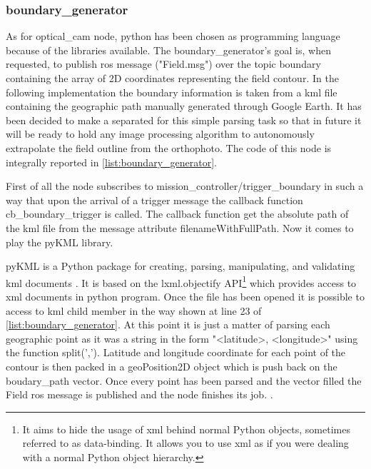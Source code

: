\subsubsection{boundary\_generator} %
\label{ssub:boundary_generator}
As for \textsf{optical\_cam} node, python has been chosen as programming language because of the libraries available.
The \textsf{boundary\_generator}'s goal is, when requested, to publish \acrshort{ros} message ("Field.msg") over the topic \textsf{boundary} containing the array of 2D coordinates representing the field contour.
In the following implementation the boundary information is taken from a \acrshort{kml} file containing the geographic path manually generated through Google Earth. It has been decided to make a separated for this simple parsing task so that in future it will be ready to hold any image processing algorithm to autonomously extrapolate the field outline from the orthophoto.
The code of this node is integrally reported in \autoref{list:boundary_generator}.\par
First of all the node subscribes to \textsf{mission\_controller/trigger\_boundary} in such a way that upon the arrival of a trigger message the callback function \textsf{cb\_boundary\_trigger} is called. The callback function get the absolute path of the \acrshort{kml} file from the message attribute \textsf{filenameWithFullPath}. Now it comes to play the pyKML library.\par
pyKML is a Python package for creating, parsing, manipulating, and validating \acrshort{kml} documents \cite{pyKML}. It is based on the \textsf{lxml.objectify} API\footnote{It aims to hide the usage of \acrshort{xml} behind normal Python objects, sometimes referred to as data-binding. It allows you to use \acrshort{xml} as if you were dealing with a normal Python object hierarchy.\cite{lxml}} which provides access to \acrshort{xml} documents in python program. Once the file has been opened it is possible to access to \acrshort{kml} child member in the way shown at line 23 of \autoref{list:boundary_generator}. At this point it is just a matter of parsing each geographic point as it was a string in the form "<latitude>, <longitude>" using the function \textsf{split(',')}.
Latitude and longitude coordinate for each point of the contour is then packed in a \textsf{geoPosition2D} object which is push back on the \textsf{boudary\_path} vector. Once every point has been parsed and the vector filled the \textsf{Field} \acrshort{ros} message is published and the node finishes its job.
.

